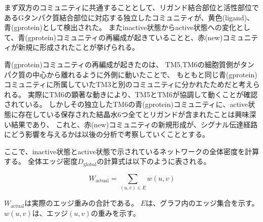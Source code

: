 \newpage

まず双方のコミュニティに共通することとして、リガンド結合部位と活性部位であるGタンパク質結合部位に対応する独立したコミュニティが、黄色(ligand)、青(gprotein)として検出された。
またinactive状態からactive状態への変化として、青(gprotein)コミュニティの再編成が起きていることと、赤(new)コミュニティが新規に形成されたことが挙げられる。

\begin{table}[!ht]
  \centering
  \caption{活性化に伴うコミュニティの再編成と、コミュニティを構成している残基群の比較}
  \label{tab:community_change}
\end{table}

青(gprotein)コミュニティの再編成が起きたのは、
TM5,TM6の細胞質側がタンパク質の中心から離れるように外側に動いたことで、
もともと同じ青(gprotein)コミュニティに所属していたTM3と別のコミュニティに分かれたためだと考えられる。
実際にTM6の顕著な動きにより、TM5とTM6が協調して動くことが確認されている。
しかしその独立したTM6の青(gprotein)コミュニティに、active状態に存在している保存された結晶水6つ全てとリガンドが含まれたことは興味深い結果であり、
これと、赤(new)コミュニティの新規形成が、シグナル伝達経路にどう影響を与えるかは以後の分析で考察していくこととする。

ここで、inactive状態とactive状態で示されているネットワークの全体密度を計算する。
全体エッジ密度$D_{\text{global}}$の計算式は以下のように表される。

\begin{equation}
W_{\text{actual}} = \sum_{(u, v) \in E} w(u, v)
\end{equation}

$W_{\text{actual}}$は実際のエッジ重みの合計である。
$E$は、グラフ内のエッジ集合を示す。
$w(u, v)$は、エッジ$(u, v)$の重みを示す。


